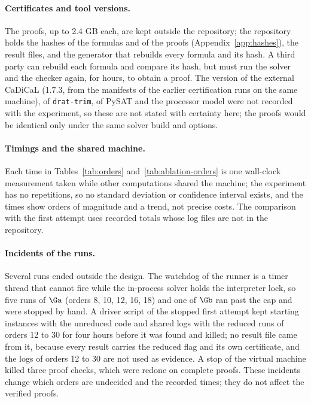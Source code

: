 \paragraph{Certificates and tool versions.} The proofs, up to 2.4 GB each, are kept outside the repository; the repository holds the hashes of the formulas and of the proofs (Appendix~\ref{app:hashes}), the result files, and the generator that rebuilds every formula and its hash. A third party can rebuild each formula and compare its hash, but must run the solver and the checker again, for hours, to obtain a proof. The version of the external
CaDiCaL (1.7.3, from the manifests of the earlier certification runs on the same machine), of \texttt{drat-trim}, of PySAT and the processor model were not recorded with the experiment, so these are not stated with certainty here; the proofs would be identical only under the same solver build and options.

\paragraph{Timings and the shared machine.} Each time in Tables~\ref{tab:orders} and~\ref{tab:ablation-orders} is one wall-clock measurement taken while other computations shared the machine; the experiment has no repetitions, so no standard deviation or confidence interval exists, and the times show orders of magnitude and a trend, not precise costs. The comparison with the first attempt uses recorded totals whose log files are not in the repository.

\paragraph{Incidents of the runs.} Several runs ended outside the design. The watchdog of the runner is a timer thread that cannot fire while the in-process solver holds the interpreter lock, so five runs of $\Ga$ (orders 8, 10, 12, 16, 18) and one of $\Gb$ ran past the cap and were stopped by hand. A driver script of the stopped first attempt kept starting instances with the unreduced code and shared logs with the reduced runs of orders
12 to 30 for four hours before it was found and killed; no result file came from it, because every result carries the reduced flag and its own certificate, and the logs of orders 12 to 30 are not used as evidence. A stop of the virtual machine killed three proof checks, which were redone on complete proofs. These incidents change which orders are undecided and the recorded times; they do not affect the verified proofs.

